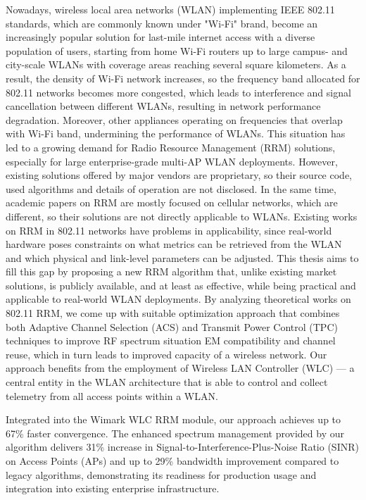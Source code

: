 Nowadays, wireless local area networks (WLAN) implementing IEEE 802.11 standards, which are commonly known under "Wi-Fi" brand, become an increasingly popular solution for last-mile internet access with a diverse population of users, starting from home Wi-Fi routers up to large campus- and city-scale WLANs with coverage areas reaching several square kilometers.
As a result, the density of Wi-Fi network increases, so the frequency band allocated for 802.11 networks becomes more congested, which leads to interference and signal cancellation between different WLANs, resulting in network performance degradation.
Moreover, other appliances operating on frequencies that overlap with Wi-Fi band, undermining the performance of WLANs.
This situation has led to a growing demand for Radio Resource Management (RRM) solutions, especially for large enterprise-grade multi-AP WLAN deployments.
However, existing solutions offered by major vendors are proprietary, so their source code, used algorithms and details of operation are not disclosed.
In the same time, academic papers on RRM are mostly focused on cellular networks, which are different, so their solutions are not directly applicable to WLANs. Existing works on RRM in 802.11 networks have problems in applicability, since real-world hardware poses constraints on what metrics can be retrieved from the WLAN and which physical and link-level parameters can be adjusted.
This thesis aims to fill this gap by proposing a new RRM algorithm that, unlike existing market solutions, is publicly available, and at least as effective, while being practical and applicable to real-world WLAN deployments.
By analyzing theoretical works on 802.11 RRM, we come up with suitable optimization approach that combines both Adaptive Channel Selection (ACS) and Transmit Power Control (TPC) techniques to improve RF spectrum situation EM compatibility and channel reuse, which in turn leads to improved capacity of a wireless network.
Our approach benefits from the employment of Wireless LAN Controller (WLC) — a central entity in the WLAN architecture that is able to control and collect telemetry from all access points within a WLAN.

Integrated into the Wimark WLC RRM module, our approach achieves up to 67\% faster convergence. The enhanced spectrum management provided by our algorithm delivers 31\% increase in Signal-to-Interference-Plus-Noise Ratio (SINR) on Access Points (APs) and up to 29\% bandwidth improvement compared to legacy algorithms, demonstrating its readiness for production usage and integration into existing enterprise infrastructure.

